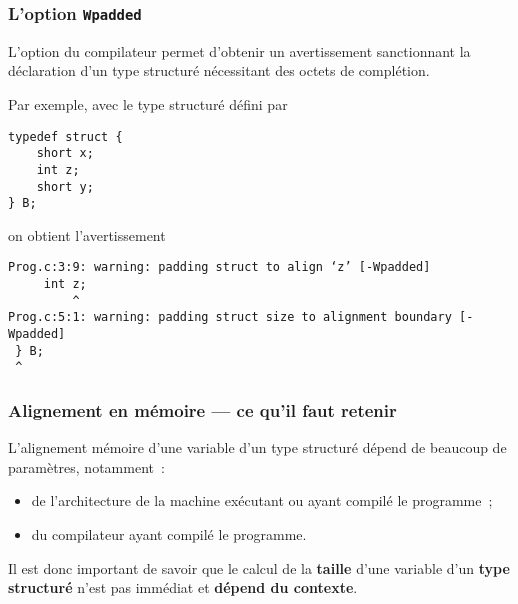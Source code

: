 \begin{frame}[fragile]
\frametitle{L'option {\tt Wpadded}}
L'option du compilateur  permet d'obtenir un avertissement
sanctionnant la déclaration d'un type structuré nécessitant des octets
de complétion.
\medskip

Par exemple, avec le type structuré  défini par
\begin{lstlisting}
typedef struct {
    short x;
    int z;
    short y;
} B;
\end{lstlisting}
on obtient l'avertissement
\begin{footnotesize}
\begin{verbatim}
Prog.c:3:9: warning: padding struct to align ‘z’ [-Wpadded]
     int z;
         ^
Prog.c:5:1: warning: padding struct size to alignment boundary [-Wpadded]
 } B;
 ^
\end{verbatim}
\end{footnotesize}
\end{frame}

\begin{frame}[fragile]
\frametitle{Alignement en mémoire --- ce qu'il faut retenir}
L'alignement mémoire d'une variable d'un type structuré dépend de
beaucoup de paramètres, notamment~:
\smallskip

\begin{itemize}
    \item de l'architecture de la machine exécutant ou ayant compilé le
    programme~;
    \smallskip

    \item du compilateur ayant compilé le programme.
\end{itemize}
\bigskip
\bigskip

Il est donc important de savoir que le calcul de la {\bf taille} d'une
variable d'un {\bf type structuré} n'est pas immédiat et
{\bf dépend du contexte}.
\end{frame}
